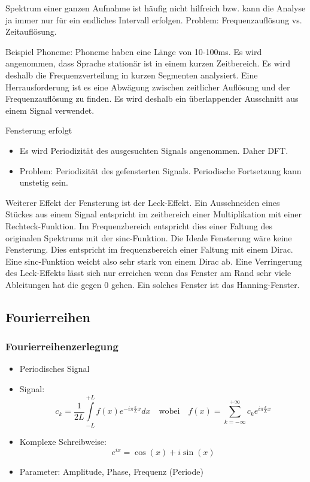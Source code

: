Spektrum einer ganzen Aufnahme ist häufig nicht hilfreich bzw. kann die Analyse ja immer nur für ein endliches Intervall erfolgen. Problem: Frequenzauflösung vs. Zeitauflösung.

Beispiel Phoneme: Phoneme haben eine Länge von 10-100ms. Es wird angenommen, dass Sprache stationär ist in einem kurzen Zeitbereich. Es wird deshalb die Frequenzverteilung in kurzen Segmenten analysiert. Eine Herrausforderung ist es eine Abwägung zwischen zeitlicher Auflösung und der Frequenzauflösung zu finden. Es wird deshalb ein überlappender Ausschnitt aus einem Signal verwendet.

Fensterung erfolgt
\begin{itemize}
	\item Es wird Periodizität des ausgesuchten Signals angenommen. Daher DFT.
	\item Problem: Periodizität des gefensterten Signals. Periodische Fortsetzung kann unstetig sein.
\end{itemize}
Weiterer Effekt der Fensterung ist der Leck-Effekt. Ein Ausschneiden eines Stückes aus einem Signal entspricht im zeitbereich einer Multiplikation mit einer Rechteck-Funktion. Im Frequenzbereich entspricht dies einer Faltung des originalen Spektrums mit der sinc-Funktion. Die Ideale Fensterung wäre keine Fensterung. Dies entspricht im frequenzbereich einer Faltung mit einem Dirac. Eine sinc-Funktion weicht also sehr stark von einem Dirac ab. Eine Verringerung des Leck-Effekts lässt sich nur erreichen wenn das Fenster am Rand sehr viele Ableitungen hat die gegen 0 gehen. Ein solches Fenster ist das Hanning-Fenster.

\subsection{Fourierreihen}

\subsubsection*{Fourierreihenzerlegung}
\begin{itemize}
\item Periodisches Signal
\item Signal: $$c_k = \frac{1}{2L} \int\limits_{-L}^{+L} f(x) e^{-i \pi \frac{k}{L} x} dx \quad \textrm{wobei} \quad f(x) = \sum\limits_{k=- \infty}^{+ \infty} c_k e^{i \pi \frac{k}{L} x}$$
\item Komplexe Schreibweise: $$e^{ix} = \cos(x) + i \sin(x)$$
\item Parameter: Amplitude, Phase, Frequenz (Periode)
\end{itemize}

